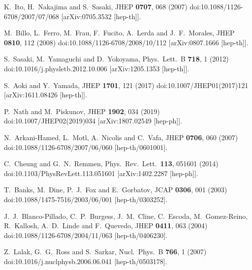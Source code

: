 \documentclass[12pt]{article}
\begin{document}
\begin{thebibliography}{99}
  K.~Ito, H.~Nakajima and S.~Sasaki,
  JHEP {\bf 0707}, 068 (2007)
  doi:10.1088/1126-6708/2007/07/068
  [arXiv:0705.3532 [hep-th]].

  M.~Billo, L.~Ferro, M.~Frau, F.~Fucito, A.~Lerda and J.~F.~Morales,
  JHEP {\bf 0810}, 112 (2008)
  doi:10.1088/1126-6708/2008/10/112
  [arXiv:0807.1666 [hep-th]].

  S.~Sasaki, M.~Yamaguchi and D.~Yokoyama,
  Phys.\ Lett.\ B {\bf 718}, 1 (2012)
  doi:10.1016/j.physletb.2012.10.006
  [arXiv:1205.1353 [hep-th]].

  S.~Aoki and Y.~Yamada,
  JHEP {\bf 1701}, 121 (2017)
  doi:10.1007/JHEP01(2017)121
  [arXiv:1611.08426 [hep-th]].

  P.~Nath and M.~Piskunov,
  JHEP {\bf 1902}, 034 (2019)
  doi:10.1007/JHEP02(2019)034
  [arXiv:1807.02549 [hep-ph]].

  N.~Arkani-Hamed, L.~Motl, A.~Nicolis and C.~Vafa,
  JHEP {\bf 0706}, 060 (2007)
  doi:10.1088/1126-6708/2007/06/060
  [hep-th/0601001].

  C.~Cheung and G.~N.~Remmen,
  Phys.\ Rev.\ Lett.\  {\bf 113}, 051601 (2014)
  doi:10.1103/PhysRevLett.113.051601
  [arXiv:1402.2287 [hep-ph]].

  T.~Banks, M.~Dine, P.~J.~Fox and E.~Gorbatov,
  JCAP {\bf 0306}, 001 (2003)
  doi:10.1088/1475-7516/2003/06/001
  [hep-th/0303252].

  J.~J.~Blanco-Pillado, C.~P.~Burgess, J.~M.~Cline, C.~Escoda, M.~Gomez-Reino, R.~Kallosh, A.~D.~Linde and F.~Quevedo,
  JHEP {\bf 0411}, 063 (2004)
  doi:10.1088/1126-6708/2004/11/063
  [hep-th/0406230].

  Z.~Lalak, G.~G.~Ross and S.~Sarkar,
  Nucl.\ Phys.\ B {\bf 766}, 1 (2007)
  doi:10.1016/j.nuclphysb.2006.06.041
  [hep-th/0503178].


\end{thebibliography}
\end{document}
